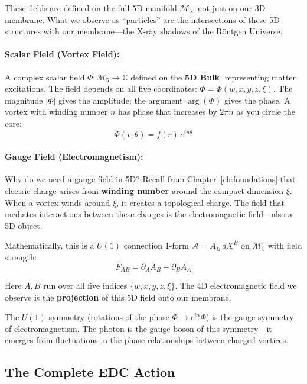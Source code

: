 These fields are defined on the full 5D manifold $\mathcal{M}_5$, not just on our 3D membrane. What we observe as ``particles'' are the intersections of these 5D structures with our membrane---the X-ray shadows of the Röntgen Universe.

\paragraph{Scalar Field (Vortex Field):}
A complex scalar field $\Phi: \mathcal{M}_5 \to \mathbb{C}$ defined on the \textbf{5D Bulk}, representing matter excitations. The field depends on all five coordinates: $\Phi = \Phi(w, x, y, z, \xi)$. The magnitude $|\Phi|$ gives the amplitude; the argument $\arg(\Phi)$ gives the phase. A vortex with winding number $n$ has phase that increases by $2\pi n$ as you circle the core:
\[
\Phi(r, \theta) = f(r) \, e^{in\theta}
\]

\paragraph{Gauge Field (Electromagnetism):}
Why do we need a gauge field in 5D? Recall from Chapter~\ref{ch:foundations} that electric charge arises from \textbf{winding number} around the compact dimension $\xi$. When a vortex winds around $\xi$, it creates a topological charge. The field that mediates interactions between these charges is the electromagnetic field---also a 5D object.

Mathematically, this is a $U(1)$ connection 1-form $\mathcal{A} = A_B\,dX^B$ on $\mathcal{M}_5$ with field strength:
\begin{equation}
F_{AB} = \partial_A A_B - \partial_B A_A
\end{equation}

Here $A, B$ run over all five indices $\{w, x, y, z, \xi\}$. The 4D electromagnetic field we observe is the \textbf{projection} of this 5D field onto our membrane.

The $U(1)$ symmetry (rotations of the phase $\Phi \to e^{i\alpha}\Phi$) is the gauge symmetry of electromagnetism. The photon is the gauge boson of this symmetry---it emerges from fluctuations in the phase relationships between charged vortices.

\newpage

\subsection{The Complete EDC Action}

